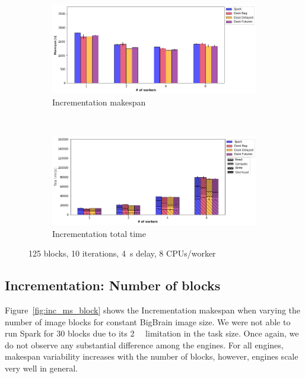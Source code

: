 \documentclass[conference]{IEEEtran}
\begin{document}
\begin{figure}[!b]
    \centering
    \begin{subfigure}[b]{\columnwidth}
        \includegraphics[clip,width=\columnwidth]{images/inc_worker.png}%
        \caption{Incrementation makespan}\label{fig:inc_ms_worker}
    \end{subfigure}
    \\
    \begin{subfigure}[b]{\columnwidth}
        \includegraphics[clip,width=\columnwidth]{images/inc_idle_worker.png}%
        \caption{Incrementation total time}\label{fig:inc_tt_worker}
    \end{subfigure}
    \caption{125 blocks, 10 iterations, \SI{4}{\second} delay, 8
    CPUs/worker}\label{fig:inc_worker}
\end{figure}

\subsection{Incrementation: Number of blocks}

Figure~\ref{fig:inc_ms_block} shows the Incrementation makespan when varying the
number of image blocks for constant BigBrain image size. We were not able to run
Spark for 30 blocks due to its \SI{2}{\giga\byte} limitation in the task size.
 Once again, we do not observe any substantial difference among the engines.
For all engines, makespan variability increases with the number of blocks, however,
engines scale very well in general.
\end{document}
